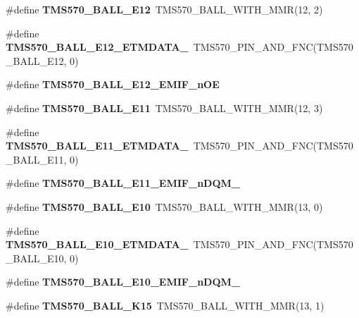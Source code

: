 \begin{DoxyCompactItemize}
\#define {\bfseries T\+M\+S570\+\_\+\+B\+A\+L\+L\+\_\+\+E12}~T\+M\+S570\+\_\+\+B\+A\+L\+L\+\_\+\+W\+I\+T\+H\+\_\+\+M\+MR(12, 2)
\item 
\mbox{\label{tms570lc4357-pins_8h_a12b523ab84a7f4330e2bbaae41185acb}} 
\#define {\bfseries T\+M\+S570\+\_\+\+B\+A\+L\+L\+\_\+\+E12\+\_\+\+E\+T\+M\+D\+A\+T\+A\+\_}~T\+M\+S570\+\_\+\+P\+I\+N\+\_\+\+A\+N\+D\+\_\+\+F\+NC(T\+M\+S570\+\_\+\+B\+A\+L\+L\+\_\+\+E12, 0)
\item 
\#define {\bfseries T\+M\+S570\+\_\+\+B\+A\+L\+L\+\_\+\+E12\+\_\+\+E\+M\+I\+F\+\_\+n\+OE}
\item 
\mbox{\label{tms570lc4357-pins_8h_a485e1f1cbef9b5ff955811eafc2c9197}} 
\#define {\bfseries T\+M\+S570\+\_\+\+B\+A\+L\+L\+\_\+\+E11}~T\+M\+S570\+\_\+\+B\+A\+L\+L\+\_\+\+W\+I\+T\+H\+\_\+\+M\+MR(12, 3)
\item 
\mbox{\label{tms570lc4357-pins_8h_a9f3a19b198579e9d1be974c2033c5c37}} 
\#define {\bfseries T\+M\+S570\+\_\+\+B\+A\+L\+L\+\_\+\+E11\+\_\+\+E\+T\+M\+D\+A\+T\+A\+\_}~T\+M\+S570\+\_\+\+P\+I\+N\+\_\+\+A\+N\+D\+\_\+\+F\+NC(T\+M\+S570\+\_\+\+B\+A\+L\+L\+\_\+\+E11, 0)
\item 
\#define {\bfseries T\+M\+S570\+\_\+\+B\+A\+L\+L\+\_\+\+E11\+\_\+\+E\+M\+I\+F\+\_\+n\+D\+Q\+M\+\_}
\item 
\mbox{\label{tms570lc4357-pins_8h_a7ae459664cdae14b2914f6fca493ed9b}} 
\#define {\bfseries T\+M\+S570\+\_\+\+B\+A\+L\+L\+\_\+\+E10}~T\+M\+S570\+\_\+\+B\+A\+L\+L\+\_\+\+W\+I\+T\+H\+\_\+\+M\+MR(13, 0)
\item 
\mbox{\label{tms570lc4357-pins_8h_a964ce035718b1ff5bcdf33217f6c0378}} 
\#define {\bfseries T\+M\+S570\+\_\+\+B\+A\+L\+L\+\_\+\+E10\+\_\+\+E\+T\+M\+D\+A\+T\+A\+\_}~T\+M\+S570\+\_\+\+P\+I\+N\+\_\+\+A\+N\+D\+\_\+\+F\+NC(T\+M\+S570\+\_\+\+B\+A\+L\+L\+\_\+\+E10, 0)
\item 
\#define {\bfseries T\+M\+S570\+\_\+\+B\+A\+L\+L\+\_\+\+E10\+\_\+\+E\+M\+I\+F\+\_\+n\+D\+Q\+M\+\_}
\item 
\mbox{\label{tms570lc4357-pins_8h_aa5d8eb1226f755772d276bbb28cd9fc7}} 
\#define {\bfseries T\+M\+S570\+\_\+\+B\+A\+L\+L\+\_\+\+K15}~T\+M\+S570\+\_\+\+B\+A\+L\+L\+\_\+\+W\+I\+T\+H\+\_\+\+M\+MR(13, 1)

\end{DoxyCompactItemize}
